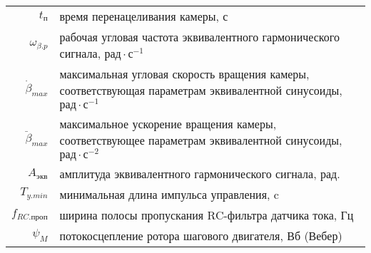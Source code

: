 \begin{table}[ht!]
\begin{tabular}{rl}
    $t_\text{п}$        & время перенацеливания камеры, с \\
    
    $\omega_{\beta.p}$  & рабочая угловая частота эквивалентного гармонического сигнала,
                         $ \text{рад} \cdot \text{с}^{-1} $ \\
    
    $\dot{\beta}_{max}$ & максимальная угловая скорость вращения камеры, соответствующая
                          параметрам эквивалентной синусоиды, $ \text{рад} \cdot \text{с}^{-1} $ \\
    
    $\ddot{\beta}_{max}$ & максимальное ускорение вращения камеры, соответствующее
                           параметрам эквивалентной синусоиды, $ \text{рад} \cdot \text{с}^{-2} $ \\
    
    $A_{\text{экв}}$    & амплитуда эквивалентного гармонического сигнала, рад. \\
    
    $T_{y.min}$         & минимальная длина импульса управления, c \\
    
    $f_{RC.\text{проп}}$& ширина полосы пропускания RC-фильтра датчика тока, Гц \\
    
    $\psi_{M}$          & потокосцепление ротора шагового двигателя, Вб (Вебер) \\

\end{tabular}
\end{table}

